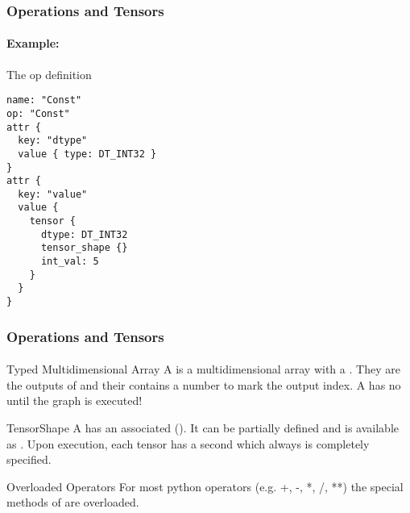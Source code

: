 \begin{frame}[fragile]
    \frametitle{Operations and Tensors}
    \framesubtitle{Example: }
    \begin{block}{The op definition}
        \begin{lstlisting}[morekeywords={name, op, attr, key, value, tensor, dtype, tensor_shape, int_val}]
name: "Const"
op: "Const"
attr {
  key: "dtype"
  value { type: DT_INT32 } 
}
attr {
  key: "value"
  value {
    tensor {
      dtype: DT_INT32
      tensor_shape {}
      int_val: 5
    } 
  }
}
        \end{lstlisting}
    \end{block}
\end{frame}




\begin{frame}
    \frametitle{Operations and Tensors}
    \framesubtitle{}
    \begin{block}{Typed Multidimensional Array}
        A   is a multidimensional array with a . They are the outputs
    of  and their  contains a number to mark the output index. A  has no 
     until the graph is executed!
    \end{block}

    \begin{block}{TensorShape}
        A  has an associated  (). 
        It can be partially defined and is available as .
        Upon execution, each tensor has a second  which always is completely specified.
    \end{block}

    \begin{block}{Overloaded Operators}
        For most python operators (e.g. +, -, *, /, **) the special methods of  are overloaded.
    \end{block}
\end{frame}

